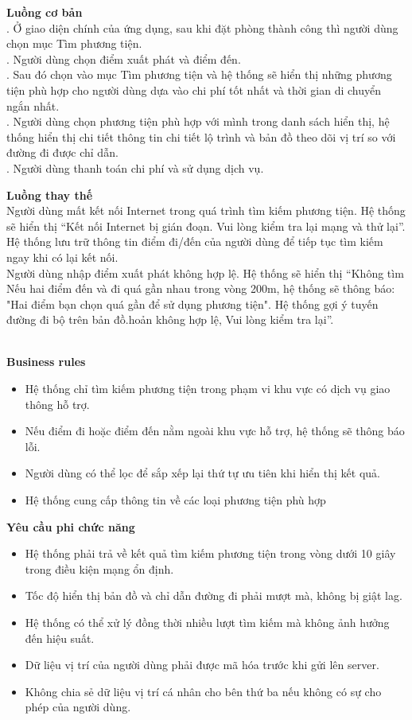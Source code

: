 \begin{small}
\textbf{Luồng cơ bản}\\
. Ở giao diện chính của ứng dụng, sau khi đặt phòng thành công thì người dùng chọn mục Tìm phương tiện.\\
. Người dùng chọn điểm xuất phát và điểm đến.\\
. Sau đó chọn vào mục Tìm phương tiện và hệ thống sẽ hiển thị những phương tiện phù hợp cho người dùng dựa vào chi phí tốt nhất và thời gian di chuyển ngắn nhất.\\
. Người dùng chọn phương tiện phù hợp với mình trong danh sách hiển thị, hệ thống hiển thị chi tiết thông tin chi tiết lộ trình và bản đồ theo dõi vị trí so với đường đi được chỉ dẫn.\\
. Người dùng thanh toán chi phí và sử dụng dịch vụ.

\textbf{Luồng thay thế}\\
 Người dùng mất kết nối Internet trong quá trình tìm kiếm phương tiện. Hệ thống sẽ hiển thị “Kết nối Internet bị gián đoạn. Vui lòng kiểm tra lại mạng và thử lại”. Hệ thống lưu trữ thông tin điểm đi/đến của người dùng để tiếp tục tìm kiếm ngay khi có lại kết nối.\\
 Người dùng nhập điểm xuất phát không hợp lệ. Hệ thống sẽ hiển thị “Không tìm \\
 Nếu hai điểm đến và đi quá gần nhau trong vòng 200m, hệ thống sẽ thông báo: "Hai điểm bạn chọn quá gần để sử dụng phương tiện". Hệ thống gợi ý tuyến đường đi bộ trên bản đồ.hoản không hợp lệ, Vui lòng kiểm tra lại”.\\
\end{small}\\
\textbf{\indent Business rules}
\begin{itemize}
    \item Hệ thống chỉ tìm kiếm phương tiện trong phạm vi khu vực có dịch vụ giao thông hỗ trợ.
    \item Nếu điểm đi hoặc điểm đến nằm ngoài khu vực hỗ trợ, hệ thống sẽ thông báo lỗi.
    \item Người dùng có thể lọc để sắp xếp lại thứ tự ưu tiên khi hiển thị kết quả.
    \item Hệ thống cung cấp thông tin về các loại phương tiện phù hợp
\end{itemize}

\textbf{Yêu cầu phi chức năng}
\begin{itemize}
    \item Hệ thống phải trả về kết quả tìm kiếm phương tiện trong vòng dưới 10 giây trong điều kiện mạng ổn định.
    \item Tốc độ hiển thị bản đồ và chỉ dẫn đường đi phải mượt mà, không bị giật lag.
    \item Hệ thống có thể xử lý đồng thời nhiều lượt tìm kiếm mà không ảnh hưởng đến hiệu suất.
    \item Dữ liệu vị trí của người dùng phải được mã hóa trước khi gửi lên server.
    \item Không chia sẻ dữ liệu vị trí cá nhân cho bên thứ ba nếu không có sự cho phép của người dùng.
\end{itemize}

